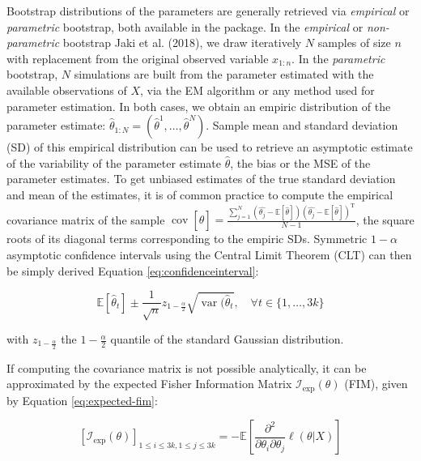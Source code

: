 Bootstrap distributions of the parameters are generally retrieved via
\emph{empirical} or \emph{parametric} bootstrap, both available in the
 package. In the \emph{empirical} or \emph{non-parametric} bootstrap
Jaki et al. (2018), we draw iteratively \(N\) samples of size \(n\) with
replacement from the original observed variable \(x_{1:n}\). In the
\emph{parametric} bootstrap, \(N\) simulations are built from the parameter
estimated with the available observations of \(X\), via the EM algorithm
or any method used for parameter estimation. In both cases, we obtain an
empiric distribution of the parameter estimate:
\(\hat{\theta}_{1:N}= (\hat{\theta}^1, \ldots, \hat{\theta}^N)\). Sample
mean and standard deviation (SD) of this empirical distribution can be
used to retrieve an asymptotic estimate of the variability of the
parameter estimate \(\hat{\theta}\), the bias or the MSE of the parameter
estimates. To get unbiased estimates of the true standard deviation and
mean of the estimates, it is of common practice to compute the empirical
covariance matrix of the sample
\(\operatorname{cov} [\hat{\theta}]= \frac{\sum_{j=1}^N (\hat{\theta_j} - \mathbb{E} [\hat{\theta}]) (\hat{\theta_j} - \mathbb{E} [\hat{\theta}])^\mathrm{T}}{N - 1}\),
the square roots of its diagonal terms corresponding to the empiric SDs.
Symmetric \(1-\alpha\) asymptotic confidence intervals using the Central
Limit Theorem (CLT) can then be simply derived Equation
\eqref{eq:confidenceinterval}:

\begin{equation}
  \mathbb{E} [\hat{\theta}_t] \pm \frac{1}{\sqrt{n}}z_{1 - \frac{\alpha}{2}} \sqrt{\operatorname{var}(\hat{\theta}_t}, \quad \forall t \in \{1, \ldots, 3k\}
\label{eq:confidenceinterval}
\end{equation}

with \(z_{1 - \frac{\alpha}{2}}\) the \(1 - \frac{\alpha}{2}\) quantile of
the standard Gaussian distribution.

If computing the covariance matrix is not possible analytically, it can
be approximated by the expected Fisher Information Matrix
\(\mathcal{I}_{\exp}(\theta)\) (FIM), given by Equation
\eqref{eq:expected-fim}:

\begin{equation}
     \left[\mathcal{I}_{\exp}(\theta)\right]_{1\le i \le 3k,1 \le j \le 3k} = - \mathbb{E} \left[\frac{\partial^2}{\partial \theta_i \partial \theta_j} \ell(\theta|X)\right]
\label{eq:expected-fim}
\end{equation}


